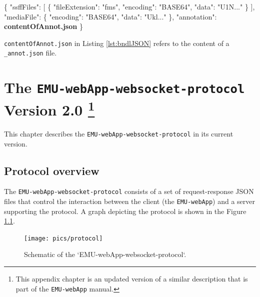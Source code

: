 \documentclass[]{book}
\newenvironment{Shaded}{\begin{snugshade}}{\end{snugshade}}
\newcommand{\DataTypeTok}[1]{\textcolor[rgb]{0.13,0.29,0.53}{#1}}
\newcommand{\ErrorTok}[1]{\textcolor[rgb]{0.64,0.00,0.00}{\textbf{#1}}}
\newcommand{\FunctionTok}[1]{\textcolor[rgb]{0.00,0.00,0.00}{#1}}
\newcommand{\OtherTok}[1]{\textcolor[rgb]{0.56,0.35,0.01}{#1}}
\newcommand{\StringTok}[1]{\textcolor[rgb]{0.31,0.60,0.02}{#1}}
\begin{document}
\begin{Shaded}
\begin{Highlighting}[]
\FunctionTok{\{}
 \DataTypeTok{"ssffFiles"}\FunctionTok{:} \OtherTok{[}
  \FunctionTok{\{}
   \DataTypeTok{"fileExtension"}\FunctionTok{:} \StringTok{"fms"}\FunctionTok{,}
   \DataTypeTok{"encoding"}\FunctionTok{:} \StringTok{"BASE64"}\FunctionTok{,}
   \DataTypeTok{"data"}\FunctionTok{:} \StringTok{"U1N..."}
  \FunctionTok{\}}
 \OtherTok{]}\FunctionTok{,}
 \DataTypeTok{"mediaFile"}\FunctionTok{:} \FunctionTok{\{}
  \DataTypeTok{"encoding"}\FunctionTok{:} \StringTok{"BASE64"}\FunctionTok{,}
  \DataTypeTok{"data"}\FunctionTok{:} \StringTok{"Ukl..."}
 \FunctionTok{\},}
 \DataTypeTok{"annotation"}\FunctionTok{:} \ErrorTok{contentOfAnnot.json}
\FunctionTok{\}}
\end{Highlighting}
\end{Shaded}

\texttt{contentOfAnnot.json} in Listing \ref{lst:bndlJSON} refers to the content of a \texttt{\_annot.json} file.

\hypertarget{app-chap:wsProtocol}{%
\chapter[The \texttt{EMU-webApp-websocket-protocol} Version 2.0 ]{\texorpdfstring{The \texttt{EMU-webApp-websocket-protocol} Version 2.0 \footnote{This appendix chapter is an updated version of a similar description that is part of the \texttt{EMU-webApp} manual.}}{The EMU-webApp-websocket-protocol Version 2.0 }}\label{app-chap:wsProtocol}}

This chapter describes the \texttt{EMU-webApp-websocket-protocol} in its current version.

\hypertarget{protocol-overview}{%
\section{Protocol overview}\label{protocol-overview}}

The \texttt{EMU-webApp-websocket-protocol} consists of a set of request-response JSON files that control the interaction between the client (the \texttt{EMU-webApp}) and a server supporting the protocol. A graph depicting the protocol is shown in the Figure \ref{fig:app-chapWsProtocolGraph}.

\begin{figure}

{\centering \texttt{[image: pics/protocol]} 

}

\caption{Schematic of the `EMU-webApp-websocket-protocol`.}\label{fig:app-chapWsProtocolGraph}
\end{figure}
\end{document}
